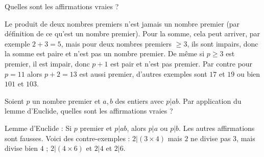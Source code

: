 \begin{question}
    Quelles sont les affirmations vraies ?
    \begin{answers} 
    \end{answers}
    \begin{explanations}
        Le produit de deux nombres premiers n'est jamais un nombre premier (par définition de ce qu'est un nombre premier).
        Pour la somme, cela peut arriver, par exemple $2+3=5$, mais pour deux nombres premiers $\ge3$, ils sont impairs, donc la somme est paire et n'est pas un nombre premier.
        De même si $p\ge3$ est premier, il est impair, donc $p+1$ est pair et n'est pas premier.
        Par contre pour $p=11$ alors $p+2=13$ est aussi premier, d'autres exemples sont $17$ et $19$ ou bien $101$ et $103$.
    \end{explanations}
\end{question}

\begin{question}   
    Soient $p$ un nombre premier et $a,b$ des entiers avec $p | ab$.
    Par application du lemme d'Euclide, quelles sont les affirmations vraies ?
    \begin{answers} 
    \end{answers}
    \begin{explanations} 
        Lemme d'Euclide : Si $p$ premier et $p | ab$, alors $p|a$ ou $p|b$.
        Les autres affirmations sont fausses. Voici des contre-exemples :
        $2 | (3 \times 4)$ mais $2$ ne divise pas $3$, mais divise bien $4$ ; 
        $2 | (4 \times 6)$ et $2|4$ et $2|6$.        
    \end{explanations}
\end{question}



